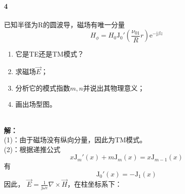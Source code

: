    \paragraph{4}已知半径为R的圆波导，磁场有唯一分量
    \begin{equation*}
        H_\phi=H_0 \mathrm{J}_0'\left(\frac{\nu_{01}}{R}r\right)\mathrm{e}^{-\mathrm{j}\beta z}
    \end{equation*}
    \begin{enumerate}
        \renewcommand*\labelenumi{(\theenumi)} %
        \item 它是TE还是TM模式？
        \item 求磁场$\vec{E}$；
        \item 分析它的模式指数$m,n$并说出其物理意义；
        \item 画出场型图。
    \end{enumerate}
    ~\\{\bfseries 解：}\\
    (1)：由于磁场没有纵向分量，因此为TM模式。\\
    (2)：根据递推公式
    \begin{equation*}
        x \mathrm{J}_m'\left(x\right)+m \mathrm{J}_m\left(x\right)=x \mathrm{J}_{m-1}\left(x\right)
    \end{equation*}
    有
    \begin{equation*}
        \mathrm{J}_0'\left(x\right)=-\mathrm{J}_1\left(x\right)
    \end{equation*}
    因此，
    $\vec{E}=\frac{1}{\mathrm{j}\omega\varepsilon}\nabla\times\vec{H}$，在柱坐标系下：
